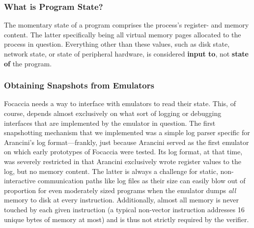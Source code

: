 \subsubsection{What is Program State?}

The momentary state of a program comprises the process's register- and memory content. The latter specifically being all
virtual memory pages allocated to the process in question. Everything other than these values, such as disk state,
network state, or state of peripheral hardware, is considered \textbf{input to}, not \textbf{state of} the program.

\subsubsection{Obtaining Snapshots from Emulators}\label{sec:obtaining_snapshots}

Focaccia needs a way to interface with emulators to read their state. This, of course, depends almost exclusively on
what sort of logging or debugging interfaces that are implemented by the emulator in question. The first snapshotting
mechanism that we implemented was a simple log parser specific for Arancini's log format---frankly, just because
Arancini served as the first emulator on which early prototypes of Focaccia were tested. Its log format, at that time,
was severely restricted in that Arancini exclusively wrote register values to the log, but no memory content. The latter
is always a challenge for static, non-interactive communication paths like log files as their size can easily blow out
of proportion for even moderately sized programs when the emulator dumps \textit{all} memory to disk at every
instruction. Additionally, almost all memory is never touched by each given instruction (a typical non-vector
instruction addresses 16 unique bytes of memory at most) and is thus not strictly required by the verifier.


